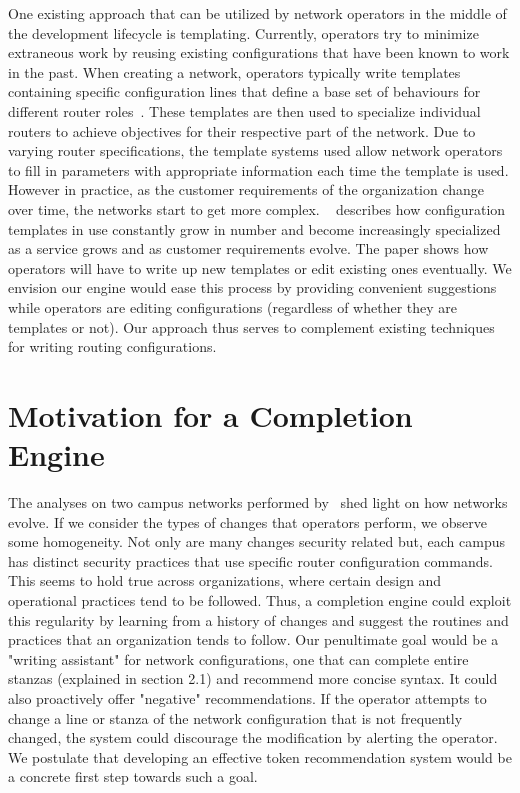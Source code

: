 \documentclass[../thesis.tex]{subfiles}
\begin{document}
One existing approach that can be utilized by network operators in the middle of the development lifecycle is templating. Currently, operators try to minimize extraneous work by reusing existing configurations that have been known to work in the past. When creating a network, operators typically write templates containing specific configuration lines that define a base set of behaviours for different router roles~\cite{complexity}. These templates are then used to specialize individual routers to achieve objectives for their respective part of the network. Due to varying router specifications, the template systems used allow network operators to fill in parameters with appropriate information each time the template is used. However in practice, as the customer requirements of the organization change over time, the networks start to get more complex. ~\cite{Benson} describes how configuration templates in use constantly grow in number and become increasingly specialized as a service grows and as customer requirements evolve. The paper shows how operators will have to write up new templates or edit existing ones eventually. We envision our engine would ease this process by providing convenient suggestions while operators are editing configurations (regardless of whether they are templates or not).
Our approach thus serves to complement existing techniques for writing routing configurations.\\ 

\section{Motivation for a Completion Engine}

The analyses on two campus networks performed by~\cite{Kim} shed light on how networks evolve. If we consider the types of changes that operators perform, we observe some homogeneity. Not only are many changes security related but, each campus has distinct security practices that use specific router configuration commands. This seems to hold true across organizations, where certain design and operational practices tend to be followed. Thus, a completion engine could exploit this regularity by learning from a history of changes and suggest the routines and practices that an organization tends to follow. Our penultimate goal would be a "writing assistant" for network configurations, one that can complete entire stanzas (explained in section 2.1) and recommend more concise syntax. It could also proactively offer "negative" recommendations. If the operator attempts to change a line or stanza of the network configuration that is not frequently changed, the system could discourage the modification by alerting the operator. We postulate that developing an effective token recommendation system would be a concrete first step towards such a goal.\\
\end{document}
